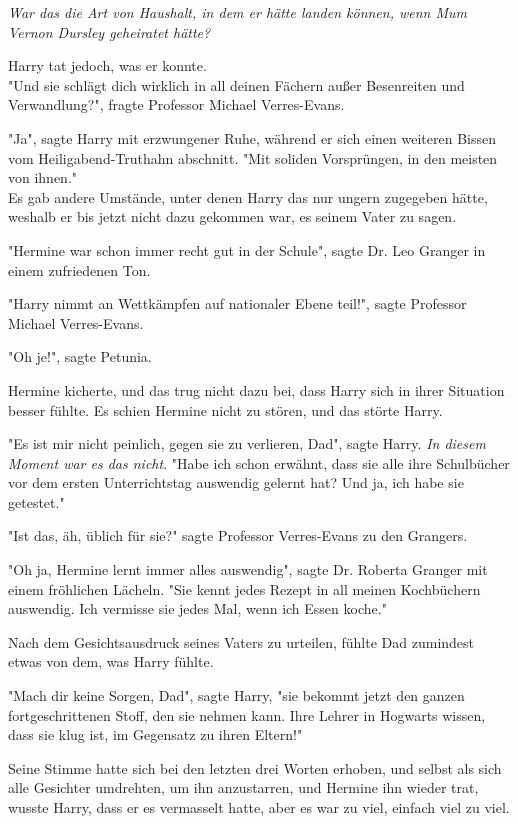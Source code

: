 {\emph{War das die Art von Haushalt, in dem er hätte landen können, wenn Mum Vernon Dursley geheiratet hätte?}

Harry tat jedoch, was er konnte.\\ "Und sie schlägt dich wirklich in all deinen Fächern außer Besenreiten und Verwandlung?", fragte Professor Michael Verres-Evans.

"Ja", sagte Harry mit erzwungener Ruhe, während er sich einen weiteren Bissen vom Heiligabend-Truthahn abschnitt. "Mit soliden Vorsprüngen, in den meisten von ihnen."\\ Es gab andere Umstände, unter denen Harry das nur ungern zugegeben hätte, weshalb er bis jetzt nicht dazu gekommen war, es seinem Vater zu sagen.

"Hermine war schon immer recht gut in der Schule", sagte Dr. Leo Granger in einem zufriedenen Ton.

"Harry nimmt an Wettkämpfen auf nationaler Ebene teil!", sagte Professor Michael Verres-Evans.

"Oh je!", sagte Petunia.

Hermine kicherte, und das trug nicht dazu bei, dass Harry sich in ihrer Situation besser fühlte. Es schien Hermine nicht zu stören, und das störte Harry.

"Es ist mir nicht peinlich, gegen sie zu verlieren, Dad", sagte Harry. \emph{In diesem Moment war es das nicht}. "Habe ich schon erwähnt, dass sie alle ihre Schulbücher vor dem ersten Unterrichtstag auswendig gelernt hat? Und ja, ich habe sie getestet."

"Ist das, äh, üblich für sie?" sagte Professor Verres-Evans zu den Grangers.

"Oh ja, Hermine lernt immer alles auswendig", sagte Dr. Roberta Granger mit einem fröhlichen Lächeln. "Sie kennt jedes Rezept in all meinen Kochbüchern auswendig. Ich vermisse sie jedes Mal, wenn ich Essen koche."

Nach dem Gesichtsausdruck seines Vaters zu urteilen, fühlte Dad zumindest etwas von dem, was Harry fühlte.

"Mach dir keine Sorgen, Dad", sagte Harry, "sie bekommt jetzt den ganzen fortgeschrittenen Stoff, den sie nehmen kann. Ihre Lehrer in Hogwarts wissen, dass sie klug ist, im Gegensatz zu ihren Eltern!"

Seine Stimme hatte sich bei den letzten drei Worten erhoben, und selbst als sich alle Gesichter umdrehten, um ihn anzustarren, und Hermine ihn wieder trat, wusste Harry, dass er es vermasselt hatte, aber es war zu viel, einfach viel zu viel.

}
